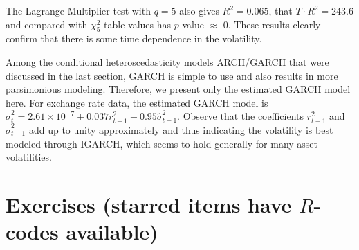 The Lagrange Multiplier test with $q=5$ also gives $R^2= 0.065$, that $T\cdot R^2= 243.6$ and compared with $\chi_5^2$ table values has $p$-value $\approx$ 0. These results clearly confirm that there is some time dependence in the volatility.


Among the conditional heteroscedasticity models ARCH/GARCH that were discussed in the last section, GARCH is simple to use and also results in more parsimonious modeling. Therefore, we present only the estimated GARCH model here. For exchange rate data, the estimated GARCH model is $\hat{\sigma}_t^2 = 2.61 \times 10^{-7} + 0.037r_{t-1}^2 + 0.95\hat{\sigma}_{t-1}^2$. Observe that the coefficients $r_{t-1}^2$ and $\hat{\sigma}_{t-1}^2$ add up to unity approximately and thus indicating the volatility is best modeled through IGARCH, which seems to hold generally for many asset volatilities.









\section{Exercises (starred items have $R$-codes available)}


